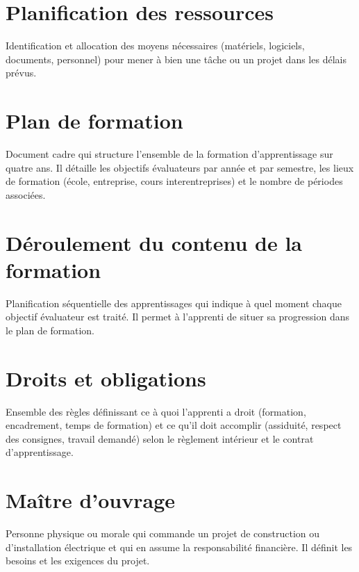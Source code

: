 \documentclass[a4paper,12pt,answers,addpoints]{exam}
\begin{document}
\begin{questions}
\begin{parts}
			\part[1]{Planification des ressources}
			\begin{solution}
				Identification et allocation des moyens nécessaires (matériels, logiciels, documents, personnel) pour mener à bien une tâche ou un projet dans les délais prévus.
			\end{solution}
			
			\part[1]{Plan de formation}
			\begin{solution}
				Document cadre qui structure l'ensemble de la formation d'apprentissage sur quatre ans. Il détaille les objectifs évaluateurs par année et par semestre, les lieux de formation (école, entreprise, cours interentreprises) et le nombre de périodes associées.
			\end{solution}
			
			\part[1]{Déroulement du contenu de la formation}
			\begin{solution}
				Planification séquentielle des apprentissages qui indique à quel moment chaque objectif évaluateur est traité. Il permet à l'apprenti de situer sa progression dans le plan de formation.
			\end{solution}
			
			\part[1]{Droits et obligations}
			\begin{solution}
				Ensemble des règles définissant ce à quoi l'apprenti a droit (formation, encadrement, temps de formation) et ce qu'il doit accomplir (assiduité, respect des consignes, travail demandé) selon le règlement intérieur et le contrat d'apprentissage.
			\end{solution}
			
			\part[1]{Maître d'ouvrage}
			\begin{solution}
				Personne physique ou morale qui commande un projet de construction ou d'installation électrique et qui en assume la responsabilité financière. Il définit les besoins et les exigences du projet.
			\end{solution}
			

\end{parts}
\end{questions}
\end{document}
